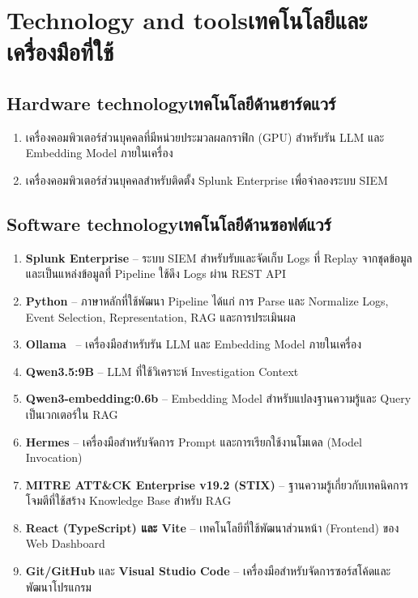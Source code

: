 \section{\ifenglish Technology and tools\else เทคโนโลยีและเครื่องมือที่ใช้\fi}

\subsection{\ifenglish Hardware technology\else เทคโนโลยีด้านฮาร์ดแวร์\fi}
\begin{enumerate}
    \item เครื่องคอมพิวเตอร์ส่วนบุคคลที่มีหน่วยประมวลผลกราฟิก (GPU)
          สำหรับรัน LLM และ Embedding Model ภายในเครื่อง

    \item เครื่องคอมพิวเตอร์ส่วนบุคคลสำหรับติดตั้ง
          Splunk Enterprise เพื่อจำลองระบบ SIEM
\end{enumerate}

\subsection{\ifenglish Software technology\else เทคโนโลยีด้านซอฟต์แวร์\fi}
\begin{enumerate}
    \item \textbf{Splunk Enterprise} -- ระบบ SIEM สำหรับรับและจัดเก็บ
          Logs ที่ Replay จากชุดข้อมูล และเป็นแหล่งข้อมูลที่ Pipeline
          ใช้ดึง Logs ผ่าน REST API

    \item \textbf{Python} -- ภาษาหลักที่ใช้พัฒนา Pipeline
          ได้แก่ การ Parse และ Normalize Logs, Event Selection,
          Representation, RAG และการประเมินผล

    \item \textbf{Ollama}~\cite{ollama} -- เครื่องมือสำหรับรัน
          LLM และ Embedding Model ภายในเครื่อง

    \item \textbf{Qwen3.5:9B} -- LLM ที่ใช้วิเคราะห์ Investigation Context

    \item \textbf{Qwen3-embedding:0.6b} -- Embedding Model สำหรับแปลงฐานความรู้และ Query เป็นเวกเตอร์ใน RAG

    \item \textbf{Hermes} -- เครื่องมือสำหรับจัดการ Prompt
          และการเรียกใช้งานโมเดล (Model Invocation)

    \item \textbf{MITRE ATT\&CK Enterprise v19.2 (STIX)}
          -- ฐานความรู้เกี่ยวกับเทคนิคการโจมตีที่ใช้สร้าง
          Knowledge Base สำหรับ RAG

    \item \textbf{React (TypeScript) และ Vite} -- เทคโนโลยีที่ใช้พัฒนาส่วนหน้า (Frontend) ของ Web Dashboard

    \item \textbf{Git/GitHub} และ \textbf{Visual Studio Code}
          -- เครื่องมือสำหรับจัดการซอร์สโค้ดและพัฒนาโปรแกรม
\end{enumerate}


